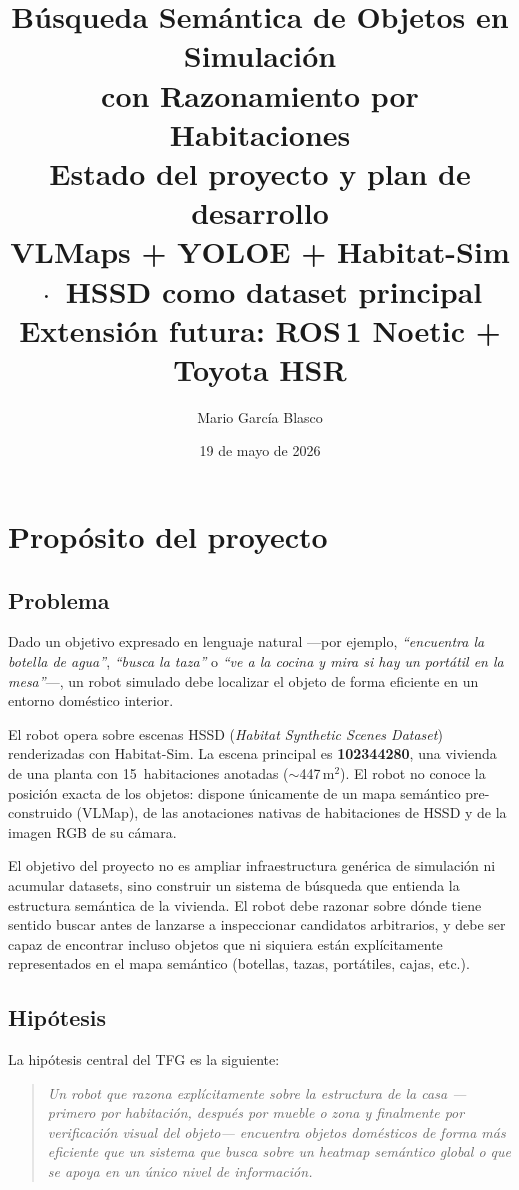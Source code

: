 \documentclass[11pt,a4paper]{article}
\title{\textbf{Búsqueda Semántica de Objetos en Simulación\\con Razonamiento por Habitaciones}\\[6pt]
\large Estado del proyecto y plan de desarrollo\\[4pt]
\normalsize VLMaps + YOLOE + Habitat-Sim \,$\cdot$\, HSSD como dataset principal\\
Extensión futura: ROS\,1 Noetic + Toyota HSR}
\author{Mario García Blasco}
\date{19 de mayo de 2026}
\begin{document}
\maketitle
\tableofcontents
\newpage

\section{Propósito del proyecto}

\subsection{Problema}

Dado un objetivo expresado en lenguaje natural ---por ejemplo, \textit{``encuentra
la botella de agua''}, \textit{``busca la taza''} o \textit{``ve a la cocina y
mira si hay un portátil en la mesa''}---, un robot simulado debe localizar el
objeto de forma eficiente en un entorno doméstico interior.

El robot opera sobre escenas HSSD (\textit{Habitat Synthetic Scenes Dataset})
renderizadas con Habitat-Sim. La escena principal es \textbf{102344280}, una
vivienda de una planta con 15~habitaciones anotadas ($\sim$447\,m$^2$). El robot
no conoce la posición exacta de los objetos: dispone únicamente de un mapa
semántico pre-construido (VLMap), de las anotaciones nativas de habitaciones de
HSSD y de la imagen RGB de su cámara.

El objetivo del proyecto no es ampliar infraestructura genérica de simulación ni
acumular datasets, sino construir un sistema de búsqueda que entienda la
estructura semántica de la vivienda. El robot debe razonar sobre dónde tiene
sentido buscar antes de lanzarse a inspeccionar candidatos arbitrarios, y debe
ser capaz de encontrar incluso objetos que ni siquiera están explícitamente
representados en el mapa semántico (botellas, tazas, portátiles, cajas, etc.).

\subsection{Hipótesis}

La hipótesis central del TFG es la siguiente:

\begin{quote}
\textit{Un robot que razona explícitamente sobre la estructura de la casa
---primero por habitación, después por mueble o zona y finalmente por
verificación visual del objeto--- encuentra objetos domésticos de forma más
eficiente que un sistema que busca sobre un heatmap semántico global o que se
apoya en un único nivel de información.}
\end{quote}
\end{document}
